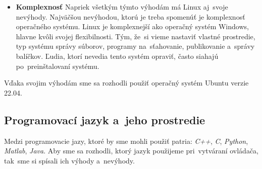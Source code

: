 \begin{itemize}
	\item \textbf{Komplexnosť} Napriek všetkým týmto výhodám má Linux aj~svoje nevýhody. Najväčšou nevýhodou, ktorú je treba
		spomenúť je komplexnosť operačného systému. Linux je komplexnejší ako operačný systém Windows, hlavne kvôli svojej
		flexibilnosti. Tým, že~si vieme nastaviť vlastné prostredie, typ systému správy súborov, programy na~sťahovanie,
		publikovanie a~správy balíčkov. Ľudia, ktorí nevedia tento systém opraviť, často siahajú po~preinštalovaní
		systému.
\end{itemize}

\noindent Vďaka svojim výhodám sme sa rozhodli použiť operačný systém Ubuntu verzie 22.04.

\subsection{Programovací jazyk a~jeho prostredie}
\label{sec:programovaci_jazyk}

Medzi programovacie jazy, ktoré by sme mohli použiť patria: \textit{C++}, \textit{C}, \textit{Python},
\textit{Matlab}, \textit{Java}. Aby sme sa rozhodli, ktorý jazyk použijeme pri~vytváraní ovládača, tak~sme si spísali
ich výhody a~nevýhody.

